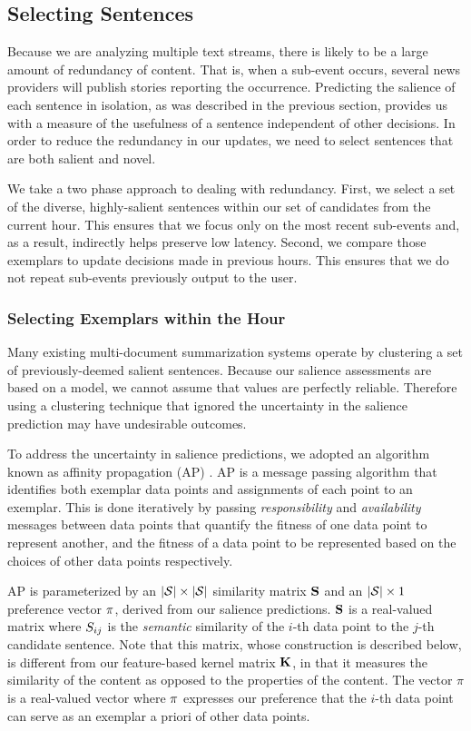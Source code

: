 \subsection{Selecting Sentences}
\label{sec:ap}
Because we are analyzing multiple text streams, there is likely to be a large amount of redundancy of content.  That is, when a sub-event occurs, several news providers will publish stories reporting the occurrence.  Predicting the salience of each sentence in isolation, as was described in the previous section, provides us with a measure of the usefulness of a sentence independent of other decisions.  In order to reduce the redundancy in our updates, we need to select sentences that  are both salient and novel.

We take a two phase approach to dealing with redundancy.  First, we select a set of the diverse, highly-salient sentences within our set of candidates from the current hour.  This ensures that we focus only on the most recent sub-events and, as a result, indirectly helps preserve low latency.  Second, we compare those exemplars to update decisions made in previous hours.  This ensures that we do not repeat sub-events previously output to the user.

\subsubsection{Selecting Exemplars within the Hour}

Many existing multi-document summarization systems operate by clustering a set of previously-deemed salient sentences.  Because our salience assessments are based on a model, we cannot assume that values are perfectly reliable.  Therefore using a clustering technique that ignored the uncertainty in the salience prediction may have undesirable outcomes.  


To address the uncertainty in salience predictions, we adopted an algorithm known as affinity propagation (AP) \cite{dueck2007non}.  AP is a message passing algorithm that identifies both exemplar data points and assignments of each point to an exemplar.  This is done iteratively by passing \emph{responsibility} and \emph{availability} messages between data points that quantify the fitness of one data point to represent another, and the fitness of a data point to be represented based on the choices of other data points respectively.

AP is parameterized by an $|\mathcal{S}|\times |\mathcal{S}|$ similarity matrix $\mathbf{S}$ and an $|\mathcal{S}|\times 1$ preference vector $\mathbf{\pi}$, derived from our salience predictions.  $\mathbf{S}$ is a real-valued matrix where $S_{ij}$ is the \emph{semantic} similarity of the $i$-th data point to the $j$-th candidate sentence.  Note that this matrix, whose construction is described below, is different from our feature-based kernel matrix $\mathbf{K}$, in that it measures the similarity of the content as opposed to the properties of the content.   The vector $\pi$ is a real-valued vector where $\mathbf{\pi}$ expresses our preference that the $i$-th data point can serve as an exemplar a priori of other data points. 


